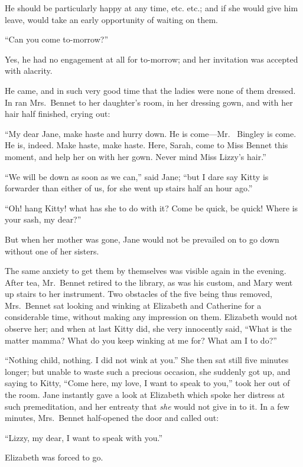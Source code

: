 He should be particularly happy at any time, etc. etc.; and if
she would give him leave, would take an early opportunity of
waiting on them.

``Can you come to-morrow?''

Yes, he had no engagement at all for to-morrow; and her
invitation was accepted with alacrity.

He came, and in such very good time that the ladies were none
of them dressed.  In ran Mrs.\ Bennet to her daughter's room, in
her dressing gown, and with her hair half finished, crying out:

``My dear Jane, make haste and hurry down.  He is come---Mr.\ %
Bingley is come.  He is, indeed.  Make haste, make haste.
Here, Sarah, come to Miss Bennet this moment, and help her
on with her gown.  Never mind Miss Lizzy's hair.''

``We will be down as soon as we can,'' said Jane; ``but I dare say
Kitty is forwarder than either of us, for she went up stairs
half an hour ago.''

``Oh! hang Kitty! what has she to do with it?  Come be quick,
be quick!  Where is your sash, my dear?''

But when her mother was gone, Jane would not be prevailed on to
go down without one of her sisters.

The same anxiety to get them by themselves was visible again
in the evening.  After tea, Mr.\ Bennet retired to the library,
as was his custom, and Mary went up stairs to her instrument.
Two obstacles of the five being thus removed, Mrs.\ Bennet
sat looking and winking at Elizabeth and Catherine for a
considerable time, without making any impression on them.
Elizabeth would not observe her; and when at last Kitty did,
she very innocently said, ``What is the matter mamma?  What do
you keep winking at me for?  What am I to do?''

``Nothing child, nothing.  I did not wink at you.''  She then sat
still five minutes longer; but unable to waste such a precious
occasion, she suddenly got up, and saying to Kitty, ``Come here,
my love, I want to speak to you,'' took her out of the room.
Jane instantly gave a look at Elizabeth which spoke her
distress at such premeditation, and her entreaty that \emph{she}
would not give in to it.  In a few minutes, Mrs.\ Bennet
half-opened the door and called out:

``Lizzy, my dear, I want to speak with you.''

Elizabeth was forced to go.

